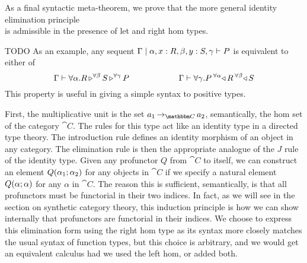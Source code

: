 \documentclass{llncs}
\begin{document}
As a final syntactic meta-theorem, we prove that the more general identity elimination principle
\[ \]
is admissible in the presence of let and right hom types.

TODO
As an example, any sequent $\Gamma \pipe \alpha, x: R, \beta, y : S, \gamma \vdash
P$ is equivalent to either of
\[ \Gamma \vdash \pendallXdotY\alpha \homrallXYtoZ \beta R \homrallXYtoZ \gamma S P 
\qquad\qquad\qquad \Gamma \vdash \pendallXdotY \gamma \homlallXYtoZ \beta S {\homlallXYtoZ \alpha R P}\]
This property is useful in giving a simple syntax to positive types.

First, the multiplicative unit is the set $\punitinXfromYtoZ {\cat C}
{a_1} {a_2}$, semantically, the hom set of the category $\cat C$. The
rules for this type act like an identity type in a directed type
theory. The introduction rule defines an identity morphism of an
object in any category. The elimination rule is then the appropriate
analogue of the $J$ rule of the identity type. Given any profunctor
$Q$ from $\cat C$ to itself, we can construct an element $\harrapp Q
{\alpha_1}{\alpha_2}$ for any objects in $\cat C$ if we specify a
natural element $\harrapp Q \alpha \alpha$ for any $\alpha$ in $\cat
C$. The reason this is sufficient, semantically, is that all
profunctors must be functorial in their two indices. In fact, as we
will see in the section on synthetic category theory, this induction
principle is how we can show internally that profunctors are
functorial in their indices. We choose to express this elimination
form using the right hom type as its syntax more closely matches the
usual syntax of function types, but this choice is arbitrary, and we
would get an equivalent calculus had we used the left hom, or added
both.





\end{document}
